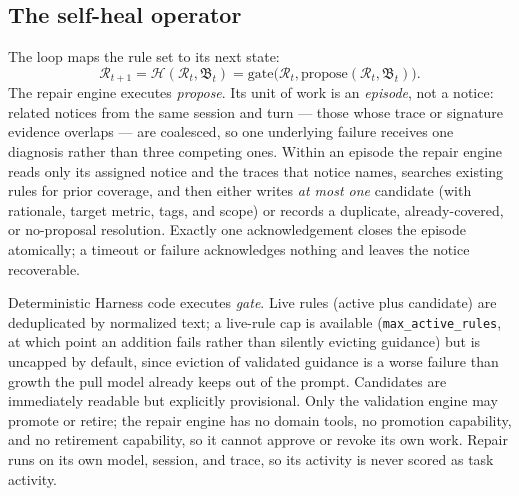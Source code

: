 \documentclass[11pt,letterpaper]{article}
\newcommand{\Rset}{\mathcal{R}}
\newcommand{\Heal}{\mathcal{H}}
\newcommand{\Breach}{\mathfrak{B}}
\begin{document}
\subsection{The self-heal operator}
\label{sec:healop}

The loop maps the rule set to its next state:
\begin{equation}
 \Rset_{t+1}=\Heal(\Rset_t,\Breach_t)
 =\mathrm{gate}\bigl(\Rset_t,\mathrm{propose}(\Rset_t,\Breach_t)\bigr).
 \label{eq:heal}
\end{equation}
The repair engine executes \emph{propose}. Its unit of work is an \emph{episode}, not a
notice: related notices from the same session and turn --- those whose trace or signature evidence
overlaps --- are coalesced, so one underlying failure receives one diagnosis rather than three
competing ones. Within an episode the repair engine reads only its assigned notice and the traces that
notice names, searches existing rules for prior coverage, and then either writes \emph{at most one}
candidate (with rationale, target metric, tags, and scope) or records a duplicate,
already-covered, or no-proposal resolution. Exactly one acknowledgement closes the episode
atomically; a timeout or failure acknowledges nothing and leaves the notice recoverable.

Deterministic Harness code executes \emph{gate}. Live rules (active plus candidate) are deduplicated
by normalized text; a live-rule cap is available (\texttt{max\_active\_rules}, at which point an
addition fails rather than silently evicting guidance) but is uncapped by default, since eviction of
validated guidance is a worse failure than growth the pull model already keeps out of the prompt.
Candidates are immediately readable but explicitly provisional. Only the validation engine may
promote or retire; the repair engine has no domain tools, no promotion capability, and no retirement capability, so it cannot approve or revoke its own work. Repair
runs on its own model, session, and trace, so its activity is never scored as task activity.
\end{document}
